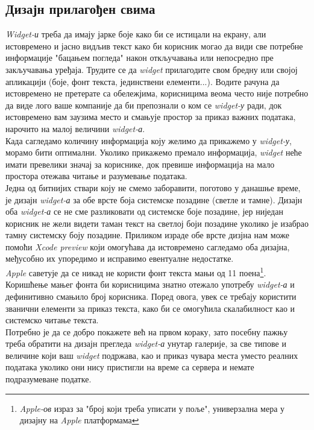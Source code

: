 \documentclass[12pt,oneside]{memoir}
\begin{document}
\subsection{Дизајн прилагођен свима}
\indent \textit{Widget-и} треба да имају јарке боје како би се истицали на екрану, али истовремено и јасно видљив текст како би корисник могао да види све потребне информације "бацањем погледа" након откључавања или непосредно пре закључавања уређаја. Трудите се да \textit{widget} прилагодите свом бредну или својој апликацији (боје, фонт текста, јединствени елементи...). Водите рачуна да истовремено не претерате са обележјима, корисницима веома често није потребно да виде лого ваше компаније да би препознали о ком се \textit{widget-у} ради, док истовремено вам заузима место и смањује простор за приказ важних података, нарочито на малој величини \textit{widget-а}.  
\\
\indent Када сагледамо количину информација коју желимо да прикажемо у \textit{widget-у}, морамо бити оптимални. Уколико прикажемо премало информација, \textit{widget} неће имати превелики значај за кориснике, док превише информација на мало простора отежава читање и разумевање података.
\\
\indent Једна од битнијих ствари коју не смемо заборавити, поготово у данашње време, је дизајн \textit{widget-а} за обе врсте боја системске позадине (светле и тамне). Дизајн оба \textit{widget-а} се не сме разликовати од системске боје позадине, јер ниједан корисник не жели видети таман текст на светлој боји позадине уколико је изабрао тамну системску боју позадине. Приликом израде обе врсте дизјна нам може помоћи \textit{Xcode preview} који омогућава да истовремено сагледамо оба дизајна, међусобно их упоредимо и исправимо евентуалне недостатке.
\\
\indent \textit{Apple} саветује да се никад не користи фонт текста мањи од 11 поена\footnote{\textit{Apple-ов} израз за "број који треба уписати у поље", универзална мера у дизајну на \textit{Apple} платформама}. Коришћење мањег фонта би корисницима знатно отежало употребу \textit{widget-а} и дефинитивно смањило број корисника. Поред овога, увек се требају користити званични елементи за приказ текста, како би се омогућила скалабилност као и системско читање текста. 
\\
\indent Потребно је да се добро покажете већ на првом кораку, зато посебну пажњу треба обратити на дизајн прегледа \textit{widget-а} унутар галерије, за све типове и величине који ваш \textit{widget} подржава, као и приказ чувара места уместо реалних података уколико они нису пристигли на време са сервера и немате подразумеване податке. 
\end{document}
